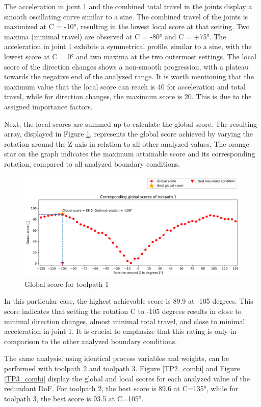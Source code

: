 The acceleration in joint 1 and the combined total travel in the joints display a smooth oscillating curve similar to a sine. The combined travel of the joints is maximized at C = -10°, resulting in the lowest local score at that setting. Two maxima (minimal travel) are observed at C = -80° and C = +75°. The acceleration in joint 1 exhibits a symmetrical profile, similar to a sine, with the lowest score at C = 0° and two maxima at the two outermost settings. The local score of the direction changes shows a non-smooth progression, with a plateau towards the negative end of the analyzed range.
It is worth mentioning that the maximum value that the local score can reach is 40 for acceleration and total travel, while for direction changes, the maximum score is 20. This is due to the assigned importance factors. 

Next, the local scores are summed up to calculate the global score. The resulting array, displayed in Figure \ref{GS1}, represents the global score achieved by varying the rotation around the Z-axis in relation to all other analyzed values. The orange star on the graph indicates the maximum attainable score and its corresponding rotation, compared to all analyzed boundary conditions.

\begin{figure}[H]
	\centerline{\includegraphics[width=1\textwidth]{figures/best_c_1.png}}
	\caption{Global score for toolpath 1}
	\label{GS1}
\end{figure}
In this particular case, the highest achievable score is 89.9 at -105 degrees. This score indicates that setting the rotation C to -105 degrees results in close to minimal direction changes, almost minimal total travel, and close to minimal acceleration in joint 1. It is crucial to emphasize that this rating is only in comparison to the other analyzed boundary conditions.

The same analysis, using identical process variables and weights, can be performed with toolpath 2 and toolpath 3. Figure \ref{TP2_combi} and Figure \ref{TP3_combi} display the global and local scores for each analyzed value of the redundant \acrshort{DoF}. For toolpath 2, the best score is 89.6 at C=135°, while for toolpath 3, the best score is 93.5 at C=105°.


